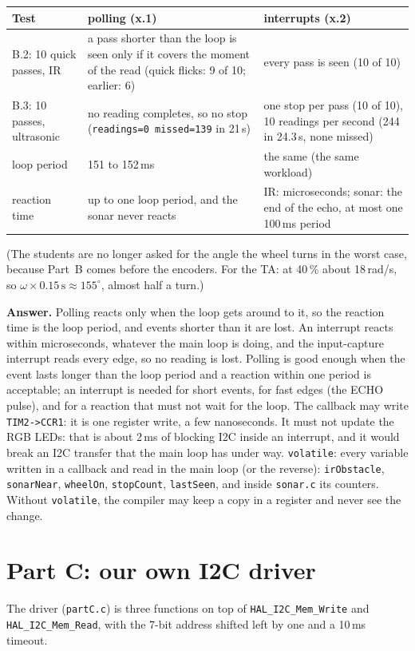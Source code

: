 \documentclass[11pt,a4paper]{article}
\begin{document}
\smallskip\noindent
\begin{tabularx}{\textwidth}{@{}l L L@{}}
\toprule
Test & polling (x.1) & interrupts (x.2) \\
\midrule
B.2: 10 quick passes, IR & a pass shorter than the loop is seen only if it covers the moment of the read (quick flicks: 9 of 10;
  earlier: 6) & every pass is seen (10 of 10) \\
B.3: 10 passes, ultrasonic & no reading completes, so no stop (\texttt{readings=0 missed=139} in 21\,s) &
  one stop per pass (10 of 10), 10 readings per second (244 in 24.3\,s, none missed) \\
loop period & 151 to 152\,ms & the same (the same workload) \\
reaction time & up to one loop period, and the sonar never reacts & IR: microseconds; sonar: the end of the echo, at
  most one 100\,ms period \\
\bottomrule
\end{tabularx}

\smallskip\noindent
(The students are no longer asked for the angle the wheel turns in the worst case, because Part~B comes before the
encoders. For the TA: at 40\,\% about 18\,rad/s, so $\omega \times 0.15\,\mathrm{s} \approx 155^\circ$, almost half a
turn.)

\textbf{Answer.} Polling reacts only when the loop gets around to it, so the reaction time is the loop period, and
events shorter than it are lost. An interrupt reacts within microseconds, whatever the main loop is doing, and the
input-capture interrupt reads every edge, so no reading is lost. Polling is good enough when the event lasts longer
than the loop period and a reaction within one period is acceptable; an interrupt is needed for short events, for
fast edges (the ECHO pulse), and for a reaction that must not wait for the loop. The callback may write
\texttt{TIM2->CCR1}: it is one register write, a few nanoseconds. It must not update the RGB LEDs: that is about
2\,ms of blocking I2C inside an interrupt, and it would break an I2C transfer that the main loop has under way.
\texttt{volatile}: every variable written in a callback and read in the main loop (or the reverse):
\texttt{irObstacle}, \texttt{sonarNear}, \texttt{wheelOn}, \texttt{stopCount}, \texttt{lastSeen}, and inside
\texttt{sonar.c} its counters. Without \texttt{volatile}, the compiler may keep a copy in a register and never see
the change.

\section{Part C: our own I2C driver}
The driver (\texttt{partC.c}) is three functions on top of \texttt{HAL\_I2C\_Mem\_Write} and
\texttt{HAL\_I2C\_Mem\_Read}, with the 7-bit address shifted left by one and a 10\,ms timeout.
\end{document}
